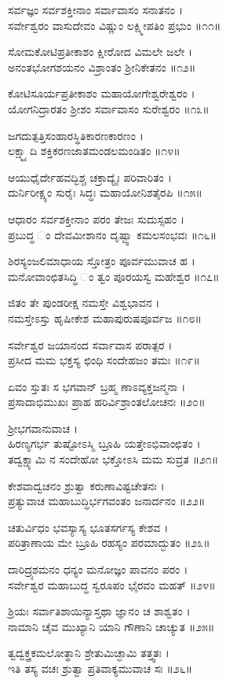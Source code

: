 ಸರ್ವಜ್ಞಂ ಸರ್ವಶಕ್ತೀನಾಂ ಸರ್ವಾವಾಸಂ ಸನಾತನಂ ।\\
ಸರ್ವೇಶ್ವರಂ ವಾಸುದೇವಂ ವಿಷ್ಣುಂ ಲಕ್ಷ್ಮೀಪತಿಂ ಪ್ರಭುಂ ॥೧೧॥

ಸೋಮಕೋಟಿಪ್ರತೀಕಾಶಂ ಕ್ಷೀರೋದ ವಿಮಲೇ ಜಲೇ ।\\
ಅನಂತಭೋಗಶಯನಂ ವಿಶ್ರಾಂತಂ ಶ್ರೀನಿಕೇತನಂ ॥೧೨॥

ಕೋಟಿಸೂರ್ಯಪ್ರತೀಕಾಶಂ ಮಹಾಯೋಗೇಶ್ವರೇಶ್ವರಂ ।\\
ಯೋಗನಿದ್ರಾರತಂ ಶ್ರೀಶಂ ಸರ್ವಾವಾಸಂ ಸುರೇಶ್ವರಂ ॥೧೩॥

ಜಗದುತ್ಪತ್ತಿಸಂಹಾರಸ್ಥಿತಿಕಾರಣಕಾರಣಂ ।\\
ಲಕ್ಷ್ಮ್ಯಾದಿ ಶಕ್ತಿಕರಣಜಾತಮಂಡಲಮಂಡಿತಂ ॥೧೪॥

ಆಯುಧೈರ್ದೇಹವದ್ಭಿಶ್ಚ ಚಕ್ರಾದ್ಯೈಃ ಪರಿವಾರಿತಂ ।\\
ದುರ್ನಿರೀಕ್ಷ್ಯಂ ಸುರೈಃ ಸಿದ್ಧಃ ಮಹಾಯೋನಿಶತೈರಪಿ ॥೧೫॥

ಆಧಾರಂ ಸರ್ವಶಕ್ತೀನಾಂ ಪರಂ ತೇಜಃ ಸುದುಸ್ಸಹಂ ।\\
ಪ್ರಬುದ್ಧ ಂ ದೇವಮೀಶಾನಂ ದೃಷ್ಟ್ವಾ ಕಮಲಸಂಭವಃ ॥೧೬॥

ಶಿರಸ್ಯಂಜಲಿಮಾಧಾಯ ಸ್ತೋತ್ರಂ ಪೂರ್ವಮುವಾಚ ಹ ।\\
ಮನೋವಾಂಛಿತಸಿದ್ಧಿ ಂ ತ್ವಂ ಪೂರಯಸ್ವ ಮಹೇಶ್ವರ ॥೧೭॥

ಜಿತಂ ತೇ ಪುಂಡರೀಕ್ಷ ನಮಸ್ತೇ ವಿಶ್ವಭಾವನ ।\\
ನಮಸ್ತೇಽಸ್ತು ಹೃಷೀಕೇಶ ಮಹಾಪುರುಷಪೂರ್ವಜ ॥೧೮॥

ಸರ್ವೇಶ್ವರ ಜಯಾನಂದ ಸರ್ವಾವಾಸ ಪರಾತ್ಪರ ।\\
ಪ್ರಸೀದ ಮಮ ಭಕ್ತಸ್ಯ ಛಿಂಧಿ ಸಂದೇಹಜಂ ತಮಃ ॥೧೯॥

ಏವಂ ಸ್ತುತಃ ಸ ಭಗವಾನ್ ಬ್ರಹ್ಮ ಣಾಽವ್ಯಕ್ತಜನ್ಮನಾ ।\\
ಪ್ರಸಾದಾಭಿಮುಖಃ ಪ್ರಾಹ ಹರಿರ್ವಿಶ್ರಾಂತಲೋಚನಃ ॥೨೦॥

ಶ್ರೀಭಗವಾನುವಾಚ ।\\
ಹಿರಣ್ಯಗರ್ಭ ತುಷ್ಟೋಽಸ್ಮಿ ಬ್ರೂಹಿ ಯತ್ತೇಽಭಿವಾಂಛಿತಂ ।\\
ತದ್ವಕ್ಷ್ಯಾಮಿ ನ ಸಂದೇಹೋ ಭಕ್ತೋಽಸಿ ಮಮ ಸುವ್ರತ ॥೨೧॥

ಕೇಶವಾದ್ವಚನಂ ಶ್ರುತ್ವಾ ಕರುಣಾವಿಷ್ಟಚೇತನಃ ।\\
ಪ್ರತ್ಯುವಾಚ ಮಹಾಬುದ್ಧಿರ್ಭಗವಂತಂ ಜನಾರ್ದನಂ ॥೨೨॥

ಚತುರ್ವಿಧಂ ಭವಸ್ಯಾಸ್ಯ ಭೂತಸರ್ಗಸ್ಯ ಕೇಶವ ।\\
ಪರಿತ್ರಾಣಾಯ ಮೇ ಬ್ರೂಹಿ ರಹಸ್ಯಂ ಪರಮಾದ್ಭುತಂ ॥೨೩॥

ದಾರಿದ್ರ್ಯಶಮನಂ ಧನ್ಯಂ ಮನೋಜ್ಞಂ ಪಾವನಂ ಪರಂ ।\\
ಸರ್ವೇಶ್ವರ ಮಹಾಬುದ್ಧ ಸ್ವರೂಪಂ ಭೈರವಂ ಮಹತ್ ॥೨೪॥

ಶ್ರಿಯಃ ಸರ್ವಾತಿಶಾಯಿನ್ಯಾಸ್ತಥಾ ಜ್ಞಾನಂ ಚ ಶಾಶ್ವತಂ ।\\
ನಾಮಾನಿ ಚೈವ ಮುಖ್ಯಾನಿ ಯಾನಿ ಗೌಣಾನಿ ಚಾಚ್ಯುತ ॥೨೫॥

ತ್ವದ್ವಕ್ತ್ರಕಮಲೋತ್ಥಾನಿ ಶ್ರೇತುಮಿಚ್ಛಾಮಿ ತತ್ತ್ವತಃ ।\\
ಇತಿ ತಸ್ಯ ವಚಃ ಶ್ರುತ್ವಾ ಪ್ರತಿವಾಕ್ಯಮುವಾಚ ಸಃ ॥೨೬॥

